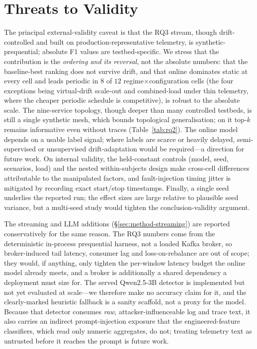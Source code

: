 \documentclass[pdflatex,sn-mathphys-num]{sn-jnl}%
\theoremstyle{thmstyleone}%
\theoremstyle{thmstyletwo}%
\theoremstyle{thmstylethree}%
\begin{document}
\section{Threats to Validity}\label{sec:threats}\label{sec:disc-threats}

The principal external-validity caveat is that the RQ3 stream, though drift-controlled and built on production-representative telemetry, is synthetic-prequential; absolute F1 values are testbed-specific. We stress that the contribution is the \emph{ordering and its reversal}, not the absolute numbers: that the baseline-best ranking does not survive drift, and that online dominates static at every cell and leads periodic in $8$ of $12$ regime$\times$configuration cells (the four exceptions being virtual-drift scale-out and combined-load under thin telemetry, where the cheaper periodic schedule is competitive), is robust to the absolute scale. The nine-service topology, though deeper than many controlled testbeds, is still a single synthetic mesh, which bounds topological generalisation; on it top-$k$ remains informative even without traces (Table~\ref{tab:rq2}). The online model depends on a usable label signal; where labels are scarce or heavily delayed, semi-supervised or unsupervised drift-adaptation would be required---a direction for future work. On internal validity, the held-constant controls (model, seed, scenarios, load) and the nested within-subjects design make cross-cell differences attributable to the manipulated factors, and fault-injection timing jitter is mitigated by recording exact start/stop timestamps. Finally, a single seed underlies the reported run; the effect sizes are large relative to plausible seed variance, but a multi-seed study would tighten the conclusion-validity argument.

The streaming and LLM additions (\S\ref{sec:method-streaming}) are reported conservatively for the same reason. The RQ3 numbers come from the deterministic in-process prequential harness, not a loaded Kafka broker, so broker-induced tail latency, consumer lag and loss-on-rebalance are out of scope; they would, if anything, only tighten the per-window latency budget the online model already meets, and a broker is additionally a shared dependency a deployment must size for. The served Qwen2.5-3B detector is implemented but not yet evaluated at scale---we therefore make no accuracy claim for it, and the clearly-marked heuristic fallback is a sanity scaffold, not a proxy for the model. Because that detector consumes \emph{raw}, attacker-influenceable log and trace text, it also carries an indirect prompt-injection exposure \cite{greshake2023} that the engineered-feature classifiers, which read only numeric aggregates, do not; treating telemetry text as untrusted before it reaches the prompt is future work.
\end{document}
